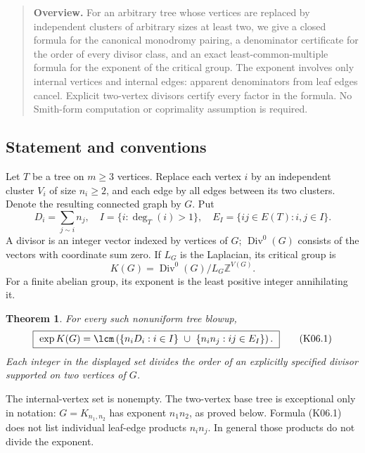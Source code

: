 \documentclass[11pt,a4paper]{article}
\newtheorem{theorem}{Theorem}[section]
\theoremstyle{definition}\newtheorem{definition}[theorem]{Definition}
\theoremstyle{remark}\newtheorem{remark}[theorem]{Remark}
\newcommand{\Z}{\mathbb Z}\newcommand{\Q}{\mathbb Q}\newcommand{\F}{\mathbb F}
\numberwithin{equation}{section}
\begin{document}
\begin{quote}\small\textbf{Overview.} For an arbitrary tree whose vertices are replaced by independent clusters of arbitrary sizes at least two, we give a closed formula for the canonical monodromy pairing, a denominator certificate for the order of every divisor class, and an exact least-common-multiple formula for the exponent of the critical group. The exponent involves only internal vertices and internal edges: apparent denominators from leaf edges cancel. Explicit two-vertex divisors certify every factor in the formula. No Smith-form computation or coprimality assumption is required.\end{quote}

\subsection{Statement and conventions}\label{K06-sec-1}
Let $T$ be a tree on $m\geq3$ vertices. Replace each vertex $i$ by an independent cluster $V_i$ of size $n_i\geq2$, and each edge by all edges between its two clusters. Denote the resulting connected graph by $G$. Put
\[
 D_i=\sum_{j\sim i}n_j,\quad I=\{i:\deg_T(i)>1\},\quad
 E_I=\{ij\in E(T):i,j\in I\}.
\]
A divisor is an integer vector indexed by vertices of $G$; $\operatorname{Div}^0(G)$ consists of the vectors with coordinate sum zero. If $L_G$ is the Laplacian, its critical group is
\[
 K(G)=\operatorname{Div}^0(G)/L_G\Z^{V(G)}.
\]
For a finite abelian group, its exponent is the least positive integer annihilating it.
\begin{theorem}\label{K06-exponent}
For every such nonuniform tree blowup,
\[
 \boxed{\ \exp K(G)=\lcm\left(
       \{n_iD_i:i\in I\}\ \cup\ \{n_in_j:ij\in E_I\}
                         \right).\ }                          \tag{K06.1}
\]
Each integer in the displayed set divides the order of an explicitly specified divisor supported on two vertices of $G$.
\end{theorem}
The internal-vertex set is nonempty. The two-vertex base tree is exceptional only in notation: $G=K_{n_1,n_2}$ has exponent $n_1n_2$, as proved below. Formula (K06.1) does not list individual leaf-edge products $n_in_j$. In general those products do not divide the exponent.
\end{document}
